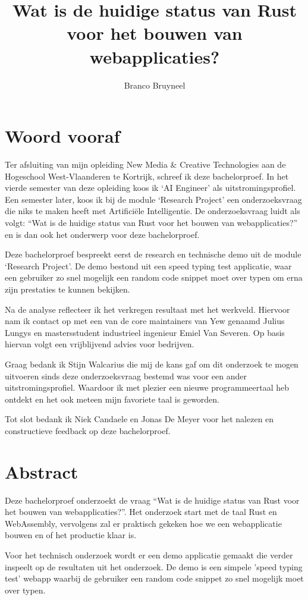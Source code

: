 \documentclass[11pt,a4paper,oneside]{book}
\author{Branco Bruyneel}
\title{Wat is de huidige status van Rust voor het bouwen van webapplicaties?}
\begin{document}
\maketitle

\chapter*{Woord vooraf}
Ter afsluiting van mijn opleiding New Media \& Creative Technologies aan de Hogeschool
West-Vlaanderen te Kortrijk, schreef ik deze bachelorproef.  In het vierde semester van deze
opleiding koos ik ‘AI Engineer’ als uitstromingsprofiel. Een semester later, koos ik bij de module
‘Research Project’ een onderzoeksvraag die niks te maken heeft met Artificiële Intelligentie. De
onderzoeksvraag luidt als volgt: “Wat is de huidige status van Rust voor het bouwen van
webapplicaties?” en is dan ook het onderwerp voor deze bachelorproef. 

Deze bachelorproef bespreekt eerst de research en technische demo uit de module ‘Research Project’.
De demo bestond uit een speed typing test applicatie, waar een gebruiker zo snel mogelijk een random
code snippet moet over typen om erna zijn prestaties te kunnen bekijken. 

Na de analyse reflecteer ik het verkregen resultaat met het werkveld. Hiervoor nam ik contact op met
een van de core maintainers van Yew genaamd Julius Lungys en mastersstudent industrieel ingenieur
Emiel Van Severen. Op basis hiervan volgt een vrijblijvend advies voor bedrijven. 

Graag bedank ik Stijn Walcarius die mij de kans gaf om dit onderzoek te mogen uitvoeren sinds deze
onderzoeksvraag bestemd was voor een ander uitstromingsprofiel. Waardoor ik met plezier een nieuwe
programmeertaal heb ontdekt en het ook meteen mijn favoriete taal is geworden. 

Tot slot bedank ik Niek Candaele en Jonas De Meyer voor het nalezen en constructieve feedback op
deze bachelorproef.

\chapter*{Abstract}
Deze bachelorproef onderzoekt de vraag \enquote{Wat is de huidige status van Rust voor het bouwen
van webapplicaties?}. Het onderzoek start met de taal Rust en WebAssembly, vervolgens zal er
praktisch gekeken hoe we een webapplicatie bouwen en of het productie klaar is.

Voor het technisch onderzoek wordt er een demo applicatie gemaakt die verder inspeelt op de
resultaten uit het onderzoek. De demo is een simpele 'speed typing test' webapp waarbij de
gebruiker een random code snippet zo snel mogelijk moet over typen.
\end{document}

